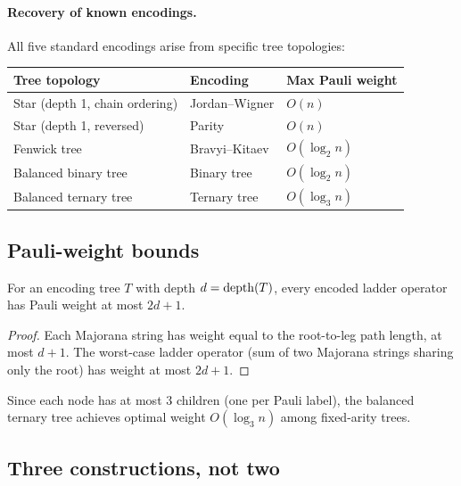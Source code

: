 \paragraph{Recovery of known encodings.}
All five standard encodings arise from specific tree topologies:
\begin{center}
\begin{tabular}{@{}lll@{}}
\toprule
Tree topology & Encoding & Max Pauli weight \\
\midrule
Star (depth 1, chain ordering) & Jordan--Wigner & $O(n)$ \\
Star (depth 1, reversed) & Parity & $O(n)$ \\
Fenwick tree & Bravyi--Kitaev & $O(\log_2 n)$ \\
Balanced binary tree & Binary tree & $O(\log_2 n)$ \\
Balanced ternary tree & Ternary tree & $O(\log_3 n)$ \\
\bottomrule
\end{tabular}
\end{center}

\subsection{Pauli-weight bounds}
\label{sec:weight-bounds}

\begin{theorem}
\label{thm:weight-bound}
For an encoding tree $T$ with depth $d = \mathrm{depth}(T)$, every encoded
ladder operator has Pauli weight at most $2d + 1$.
\end{theorem}

\begin{proof}
Each Majorana string has weight equal to the root-to-leg path length,
at most $d + 1$.  The worst-case ladder operator (sum of two Majorana
strings sharing only the root) has weight at most $2d + 1$.
\end{proof}

\begin{corollary}
\label{cor:optimal-weight}
Since each node has at most 3 children (one per Pauli label), the
balanced ternary tree achieves optimal weight $O(\log_3 n)$ among
fixed-arity trees.
\end{corollary}

\subsection{Three constructions, not two}
\label{sec:three-constructions}

